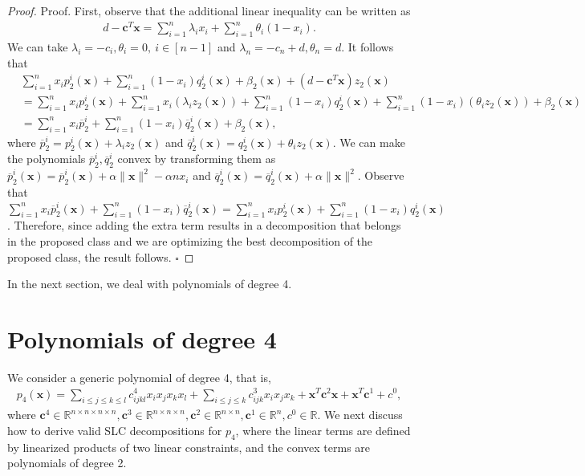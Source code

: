 \documentclass[opre,nonblindrev]{informs3} %
\begin{document}
\begin{proof}{Proof. }
First, observe that the additional linear inequality can be written as 
\begin{align*}
    d - \boldsymbol{c}^T \boldsymbol{x} = \sum_{i=1}^n \lambda_i x_i + \sum_{i=1}^n \theta_i (1-x_i).
\end{align*} 
We can take $\lambda_i = -c_i, \theta_i = 0, \: i \in [n-1]$ and $\lambda_n = -c_n + d, \theta_n = d$. It follows that 
\begin{align*}
   & \sum_{i=1}^n x_i p_2^i(\boldsymbol{x}) + \sum_{i=1}^n(1-x_i) q_2^i(\boldsymbol{x}) + \beta_2(\boldsymbol{x}) + (d-\boldsymbol{c}^T \boldsymbol{x}) z_2(\boldsymbol{x})  \\
   &= \sum_{i=1}^n x_i p_2^i(\boldsymbol{x}) + \sum_{i=1}^n x_i \left(\lambda_i z_2(\boldsymbol{x}) \right) + \sum_{i=1}^n(1-x_i) q_2^i(\boldsymbol{x}) + \sum_{i=1}^n (1-x_i) (\theta_i z_2(\boldsymbol{x})) + \beta_2(\boldsymbol{x}) \\ 
    &= \sum_{i=1}^n x_i \overline{p}_2^i + \sum_{i=1}^n (1-x_i) \overline{q}_2^i(\boldsymbol{x}) + \beta_2(\boldsymbol{x}),
\end{align*} 
where $\overline{p}_2^i = p_2^i(\boldsymbol{x}) + \lambda_i z_2(\boldsymbol{x})$ and $\overline{q}_2^i(\boldsymbol{x}) = q_2^i(\boldsymbol{x}) + \theta_i z_2(\boldsymbol{x}) $. We can make the polynomials $\overline{p}_2^i, \overline{q}_2^i$ convex by transforming them as $\overline{p}_2^i(\boldsymbol{x}) = \overline{p}_2^i(\boldsymbol{x}) + \alpha \|\boldsymbol{x}\|^2 - \alpha n x_i$ and $\overline{q}_2^i(\boldsymbol{x}) = \overline{q}_2^i(\boldsymbol{x}) + \alpha \|\boldsymbol{x}\|^2$. Observe that $\sum_{i=1}^n x_i \overline{p}_2^i(\boldsymbol{x}) + \sum_{i=1}^n(1-x_i) \overline{q}_2^i(\boldsymbol{x}) = \sum_{i=1}^n x_i p_2^i(\boldsymbol{x}) + \sum_{i=1}^n (1-x_i) q_2^i(\boldsymbol{x})$. Therefore, since adding the extra term results in a decomposition that belongs in the proposed class and we are optimizing the best decomposition of the proposed class, the result follows. \hfill $\square$
\end{proof}  
In the next section, we deal with polynomials of degree 4.

\section{Polynomials of degree 4}   
We consider a generic polynomial of degree 4, that is,  
\begin{align*}
    p_4(\boldsymbol{x}) = \sum_{i \le j \le k \le l} c_{ijkl}^4 x_i x_j x_k x_l + \sum_{i \le j \le k} c_{ijk}^3 x_i x_j x_k + \boldsymbol{x}^T \boldsymbol{c}^2 \boldsymbol{x} + \boldsymbol{x}^T \boldsymbol{c}^1 + c^0,
\end{align*}    
where $\boldsymbol{c}^4 \in \mathbb{R}^{n \times n \times n \times n}, \boldsymbol{c}^3 \in \mathbb{R}^{n \times n \times n}, \boldsymbol{c}^2 \in \mathbb{R}^{n \times n}, \boldsymbol{c}^1 \in \mathbb{R}^n, c^0 \in \mathbb{R}$. We next discuss how to derive valid SLC decompositions for $p_4$, where the linear terms are defined by linearized products of two linear constraints, and the convex terms are polynomials of degree 2.  
\end{document}
